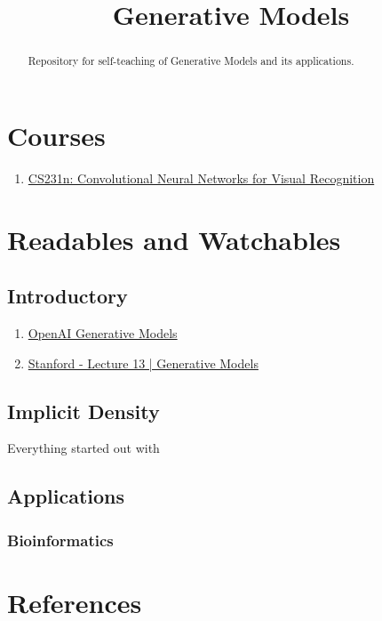 \documentclass[12pt]{article}
\begin{document}
\title{Generative Models}
\maketitle
\tableofcontents

\begin{abstract}
  Repository for self-teaching of Generative Models and its applications.
\end{abstract}

\section{Courses}
\begin{enumerate}
  \item \href{http://cs231n.stanford.edu/}{CS231n: Convolutional Neural Networks for Visual Recognition}
\end{enumerate}

\section{Readables and Watchables}
  \subsection{Introductory}
    \begin{enumerate}
      \item \href{https://openai.com/blog/generative-models/}{OpenAI Generative Models}
      \item \href{https://www.youtube.com/watch?v=5WoItGTWV54}{Stanford - Lecture 13 | Generative Models}
    \end{enumerate}

  \subsection{Implicit Density}
  Everything started out with \cite{goodfellow2014generative}
  \subsection{Applications}
    \subsubsection{Bioinformatics}

\section{References}
\printbibliography
\end{document}
